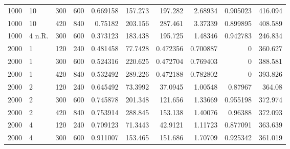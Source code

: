 \begin{tabular}{rlrrrrrrrr}
       1000 & 10         &            300 &             600 &              0.669158 &                157.273  &              197.282    &          2.68934  &            0.905023 &            416.094 \\
       1000 & 10         &            420 &             840 &              0.75182  &                203.156  &              287.461    &          3.37339  &            0.899895 &            408.589 \\
       1000 & 4 n.R.     &            300 &             600 &              0.373123 &                183.438  &              195.725    &          1.48346  &            0.942783 &            246.834 \\
       2000 & 1          &            120 &             240 &              0.481458 &                 77.7428 &                0.472356 &          0.700887 &            0        &            360.627 \\
       2000 & 1          &            300 &             600 &              0.524316 &                220.625  &                0.472704 &          0.769403 &            0        &            388.581 \\
       2000 & 1          &            420 &             840 &              0.532492 &                289.226  &                0.472188 &          0.782802 &            0        &            393.826 \\
       2000 & 2          &            120 &             240 &              0.645492 &                 73.3992 &               37.0945   &          1.00548  &            0.87967  &            364.08  \\
       2000 & 2          &            300 &             600 &              0.745878 &                201.348  &              121.656    &          1.33669  &            0.955198 &            372.974 \\
       2000 & 2          &            420 &             840 &              0.753914 &                288.845  &              153.138    &          1.40076  &            0.96388  &            372.093 \\
       2000 & 4          &            120 &             240 &              0.709123 &                 71.3443 &               42.9121   &          1.11723  &            0.877091 &            363.639 \\
       2000 & 4          &            300 &             600 &              0.911007 &                153.465  &              151.686    &          1.70709  &            0.925342 &            361.019 \\

\end{tabular}
